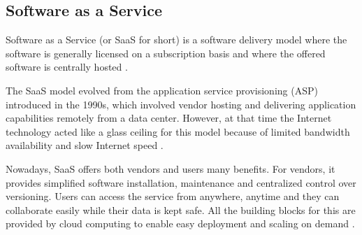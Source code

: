 
\subsection{Software as a Service}

Software as a Service (or SaaS for short) is a software delivery model where the software is generally licensed on a subscription basis and where the offered software is centrally hosted \cite{SaaSWikipedia}.

The SaaS model evolved from the application service provisioning (ASP) introduced in the 1990s, which involved vendor hosting and delivering application capabilities remotely from a data center. However, at that time the Internet technology acted like a glass ceiling for this model because of limited bandwidth availability and slow Internet speed \cite{SaaSOppRisk}.

Nowadays, SaaS offers both vendors and users many benefits. For vendors, it provides simplified software installation, maintenance and centralized control over versioning. Users can access the service from anywhere, anytime and they can collaborate easily while their data is kept safe. All the building blocks for this are provided by cloud computing to enable easy deployment and scaling on demand \cite{AboveTheClouds}.

